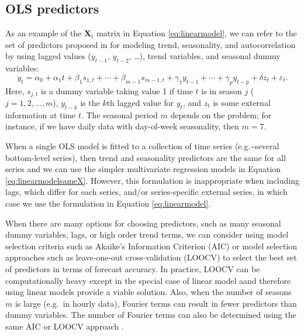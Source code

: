 \documentclass[11pt,a4paper,]{article}
\begin{document}
\hypertarget{ols-predictors}{%
\subsection{OLS predictors}\label{ols-predictors}}

As an example of the \(\bm{X}_t\) matrix in Equation \eqref{eq:linearmodel}, we can refer to the set of predictors proposed in \textcite{ashouri2018} for modeling trend, seasonality, and autocorrelation by using lagged values (\(y_{t-1}\), \(y_{t-2}\), \dots), trend variables, and seasonal dummy variables:
\begin{equation}\label{eq:linearmodelexample}
   y_t = \alpha_0 + \alpha_1 t + \beta_1 s_{1,t} + \cdots + \beta_{m-1} s_{m-1,t} + \gamma_1 y_{t-1} + \cdots + \gamma_p y_{t-p} + \delta z_t + \varepsilon_t.
\end{equation}
Here, \(s_{j,t}\) is a dummy variable taking value 1 if time \(t\) is in season \(j\) (\(j=1, 2, \dots, m\)), \(y_{t-k}\) is the \(k\)th lagged value for \(y_t\), and \(z_t\) is some external information at time \(t\). The seasonal period \(m\) depends on the problem; for instance, if we have daily data with day-of-week seasonality, then \(m=7\).

When a single OLS model is fitted to a collection of time series (e.g.\textasciitilde several bottom-level series), then trend and seasonality predictors are the same for all series and we can use the simpler multivariate regression models in Equation \eqref{eq:linearmodelsameX}. However, this formulation is inappropriate when including lags, which differ for each series, and/or series-specific external series, in which case we use the formulation in Equation \eqref{eq:linearmodel}.

When there are many options for choosing predictors, such as many seasonal dummy variables, lags, or high order trend terms, we can consider using model selection criteria such as Akaike's Information Criterion (AIC) or model selection approaches such as leave-one-out cross-validation (LOOCV) to select the best set of predictors in terms of forecast accuracy. In practice, LOOCV can be computationally heavy except in the special case of linear model \autocite{christensenplane} aand therefore using linear models provide a viable solution. Also, when the number of seasons \(m\) is large (e.g.~in hourly data), Fourier terms can result in fewer predictors than dummy variables. The number of Fourier terms can also be determined using the same AIC or LOOCV approach \autocite{fpp2}.
\end{document}
